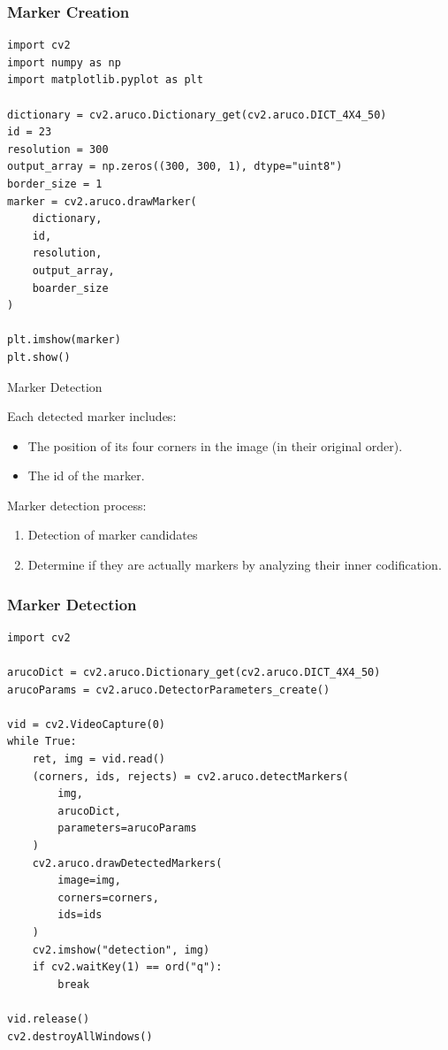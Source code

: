 \documentclass[12pt,letterpaper]{beamer}
\begin{document}
\begin{frame}[fragile]
    \frametitle{Marker Creation}

    {\scriptsize
    \begin{verbatim}
import cv2
import numpy as np
import matplotlib.pyplot as plt

dictionary = cv2.aruco.Dictionary_get(cv2.aruco.DICT_4X4_50)
id = 23
resolution = 300
output_array = np.zeros((300, 300, 1), dtype="uint8")
border_size = 1
marker = cv2.aruco.drawMarker(
    dictionary, 
    id, 
    resolution, 
    output_array, 
    boarder_size
)

plt.imshow(marker)
plt.show()
    \end{verbatim}
}
\end{frame}

\begin{frame}{Marker Detection}

    Each detected marker includes:
    {\scriptsize
        \begin{itemize}
            \item The position of its four corners in the image (in their original order).
            \item The id of the marker.
        \end{itemize}
    }
    Marker detection process:
    {\scriptsize
        \begin{enumerate}
            \item Detection of marker candidates
            \item Determine if they are actually markers by analyzing their inner codification.
        \end{enumerate}
    }
\end{frame}

\begin{frame}[fragile]
    \frametitle{Marker Detection}
    \scriptsize
    \begin{verbatim}
import cv2

arucoDict = cv2.aruco.Dictionary_get(cv2.aruco.DICT_4X4_50)
arucoParams = cv2.aruco.DetectorParameters_create()

vid = cv2.VideoCapture(0)
while True:
    ret, img = vid.read()
    (corners, ids, rejects) = cv2.aruco.detectMarkers(
        img,
        arucoDict,
        parameters=arucoParams
    )
    cv2.aruco.drawDetectedMarkers(
        image=img,
        corners=corners,
        ids=ids
    )
    cv2.imshow("detection", img)
    if cv2.waitKey(1) == ord("q"):
        break

vid.release()
cv2.destroyAllWindows()
    \end{verbatim}
\end{frame}
\end{document}
